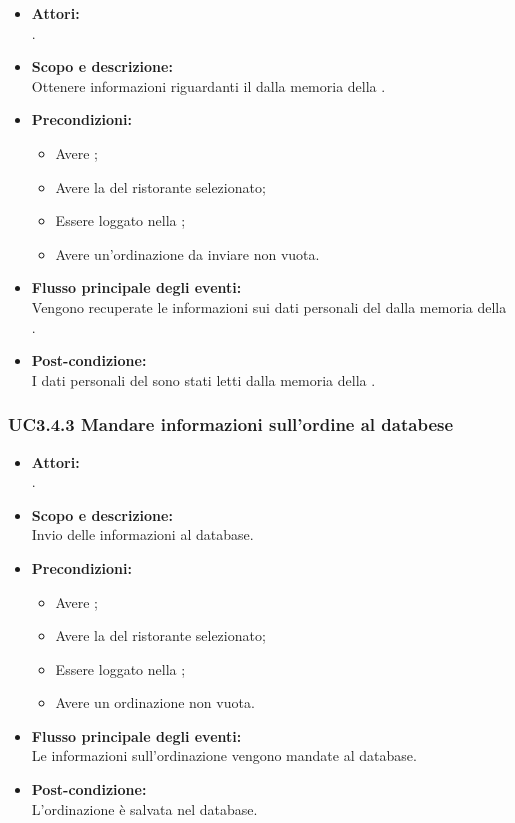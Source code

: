 \begin{itemize}
	\item \textbf{Attori:}
	\\.
	\item \textbf{Scopo e descrizione:} 
	\\Ottenere informazioni riguardanti il  dalla memoria della .
	\item \textbf{Precondizioni:}
	\begin{itemize}
		\item Avere ;
		\item Avere la  del ristorante selezionato;
		\item Essere loggato nella ;
		\item Avere un'ordinazione da inviare non vuota.
	\end{itemize}
	\item \textbf{Flusso principale degli eventi:}
	\\Vengono recuperate le informazioni sui dati personali del  dalla memoria della .
	\item \textbf{Post-condizione:}
	\\I dati personali del  sono stati letti dalla memoria della .
\end{itemize}

\subsubsection{UC3.4.3 Mandare informazioni sull'ordine al databese} \label{UC3.4.3}

\begin{itemize}
	\item \textbf{Attori:}
	\\.
	\item \textbf{Scopo e descrizione:} 
	\\Invio delle informazioni al database.
	\item \textbf{Precondizioni:}
	\begin{itemize}
		\item Avere ;
		\item Avere la  del ristorante selezionato;
		\item Essere loggato nella ;
		\item Avere un ordinazione non vuota.
	\end{itemize}
	\item \textbf{Flusso principale degli eventi:}
	\\Le informazioni sull'ordinazione vengono mandate al database.
	\item \textbf{Post-condizione:}
	\\L'ordinazione è salvata nel database.
\end{itemize}

